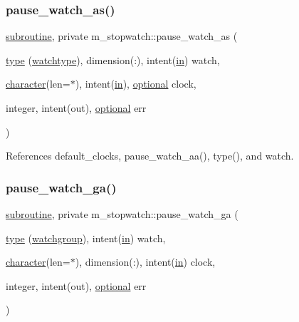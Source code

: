 \subsubsection{\texorpdfstring{pause\+\_\+watch\+\_\+as()}{pause\_watch\_as()}}
{\footnotesize\ttfamily \hyperlink{M__stopwatch_83_8txt_acfbcff50169d691ff02d4a123ed70482}{subroutine}, private m\+\_\+stopwatch\+::pause\+\_\+watch\+\_\+as (\begin{DoxyParamCaption}\item[{\hyperlink{stop__watch_83_8txt_a70f0ead91c32e25323c03265aa302c1c}{type} (\hyperlink{structm__stopwatch_1_1watchtype}{watchtype}), dimension(\+:), intent(\hyperlink{M__journal_83_8txt_afce72651d1eed785a2132bee863b2f38}{in})}]{watch,  }\item[{\hyperlink{option__stopwatch_83_8txt_abd4b21fbbd175834027b5224bfe97e66}{character}(len=$\ast$), intent(\hyperlink{M__journal_83_8txt_afce72651d1eed785a2132bee863b2f38}{in}), \hyperlink{option__stopwatch_83_8txt_aa4ece75e7acf58a4843f70fe18c3ade5}{optional}}]{clock,  }\item[{integer, intent(out), \hyperlink{option__stopwatch_83_8txt_aa4ece75e7acf58a4843f70fe18c3ade5}{optional}}]{err }\end{DoxyParamCaption})\hspace{0.3cm}{\ttfamily [private]}}



References default\+\_\+clocks, pause\+\_\+watch\+\_\+aa(), type(), and watch.

\mbox{\label{namespacem__stopwatch_aaba5f0339d92da284d233dcb2f4d083a}} 
\subsubsection{\texorpdfstring{pause\+\_\+watch\+\_\+ga()}{pause\_watch\_ga()}}
{\footnotesize\ttfamily \hyperlink{M__stopwatch_83_8txt_acfbcff50169d691ff02d4a123ed70482}{subroutine}, private m\+\_\+stopwatch\+::pause\+\_\+watch\+\_\+ga (\begin{DoxyParamCaption}\item[{\hyperlink{stop__watch_83_8txt_a70f0ead91c32e25323c03265aa302c1c}{type} (\hyperlink{structm__stopwatch_1_1watchgroup}{watchgroup}), intent(\hyperlink{M__journal_83_8txt_afce72651d1eed785a2132bee863b2f38}{in})}]{watch,  }\item[{\hyperlink{option__stopwatch_83_8txt_abd4b21fbbd175834027b5224bfe97e66}{character}(len=$\ast$), dimension(\+:), intent(\hyperlink{M__journal_83_8txt_afce72651d1eed785a2132bee863b2f38}{in})}]{clock,  }\item[{integer, intent(out), \hyperlink{option__stopwatch_83_8txt_aa4ece75e7acf58a4843f70fe18c3ade5}{optional}}]{err }\end{DoxyParamCaption})\hspace{0.3cm}{\ttfamily [private]}}



